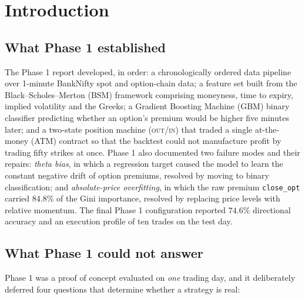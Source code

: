 \documentclass[11pt,a4paper]{article}
\newcommand{\code}[1]{\texttt{#1}}
\begin{document}
\tableofcontents
\newpage

\section{Introduction}

\subsection{What Phase 1 established}

The Phase 1 report \cite{phase1} developed, in order: a chronologically ordered data
pipeline over 1-minute BankNifty spot and option-chain data; a feature set built from
the Black--Scholes--Merton (BSM) framework \cite{blackscholes,merton} comprising
moneyness, time to expiry, implied volatility and the Greeks; a Gradient Boosting
Machine (GBM) binary classifier predicting whether an option's premium would be higher
five minutes later; and a two-state position machine (\textsc{out}/\textsc{in}) that
traded a single at-the-money (ATM) contract so that the backtest could not manufacture
profit by trading fifty strikes at once. Phase 1 also documented two failure modes and
their repairs: \emph{theta bias}, in which a regression target caused the model to learn
the constant negative drift of option premiums, resolved by moving to binary
classification; and \emph{absolute-price overfitting}, in which the raw premium
\code{close\_opt} carried $84.8\%$ of the Gini importance, resolved by replacing price
levels with relative momentum. The final Phase 1 configuration reported $74.6\%$
directional accuracy and an execution profile of ten trades on the test day.

\subsection{What Phase 1 could not answer}

Phase 1 was a proof of concept evaluated on \emph{one} trading day, and it deliberately
deferred four questions that determine whether a strategy is real:
\end{document}
